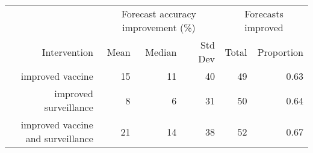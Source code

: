 
\begin{tabular*}{1.0\textwidth}{rrrrrr}
\toprule
             & \multicolumn{3}{c}{Forecast accuracy improvement (\%)} & \multicolumn{2}{c}{Forecasts improved} \\
Intervention & Mean & Median & Std Dev & Total & Proportion \\
\midrule

improved vaccine & 15 & 11 & 40 & 49 & 0.63 \\
improved surveillance & 8 & 6 & 31 & 50 & 0.64 \\
improved vaccine and surveillance & 21 & 14 & 38 & 52 & 0.67 \\

\bottomrule
\end{tabular*}

